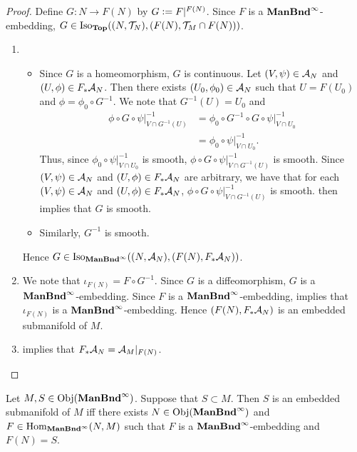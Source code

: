 \documentclass{book}
\begin{document}
	\begin{proof} Define $G:N \rightarrow F(N)$ by $G \vcentcolon= F|^{F(N)}$. Since $F$ is a $\operatorname*{\text{\textbf{ManBnd}}^{\infty}}$-embedding, $G \in \operatorname{Iso}_{\operatorname*{\text{\textbf{Top}}}}((N, \mathcal{T}_N), (F(N), \mathcal{T}_M \cap F(N)))$. 
		\begin{enumerate}
			\item 
			\begin{itemize}
				\item Since $G$ is a homeomorphism, $G$ is continuous. Let $(V, \psi) \in \mathcal{A}_N$ and $(U, \phi) \in F_*\mathcal{A}_N$. Then there exists $(U_0, \phi_0) \in \mathcal{A}_N$ such that $U = F(U_0)$ and $\phi = \phi_0 \circ G^{-1}$. We note that $G^{-1}(U) = U_0$ and 
				\begin{align*}
					\phi \circ G \circ \psi|_{V \cap G^{-1}(U)}^{-1}
					& = \phi_0 \circ G^{-1} \circ G \circ \psi|_{V \cap U_0}^{-1} \\
					& = \phi_0 \circ \psi|_{V \cap U_0}^{-1}. 
				\end{align*}
				Thus, since $\phi_0 \circ \psi|_{V \cap U_0}^{-1}$ is smooth, $\phi \circ G \circ \psi|_{V \cap G^{-1}(U)}^{-1}$ is smooth. Since $(V, \psi) \in \mathcal{A}_N$ and $(U, \phi) \in F_*\mathcal{A}_N$ are arbitrary, we have that for each $(V, \psi) \in \mathcal{A}_N$ and $(U, \phi) \in F_*\mathcal{A}_N$, $\phi \circ G \circ \psi|_{V \cap G^{-1}(U)}^{-1}$ is smooth.  then implies that $G$ is smooth. 
				\item Similarly, $G^{-1}$ is smooth.
			\end{itemize}
			Hence $G \in \operatorname{Iso}_{\operatorname*{\text{\textbf{ManBnd}}^{\infty}}}((N, \mathcal{A}_N), (F(N), F_*\mathcal{A}_N))$.
			\item We note that $\iota_{F(N)} = F \circ G^{-1}$. Since $G$ is a diffeomorphism, $G$ is a $\operatorname*{\text{\textbf{ManBnd}}^{\infty}}$-embedding. Since $F$ is a $\operatorname*{\text{\textbf{ManBnd}}^{\infty}}$-embedding, \rex{}  implies that $\iota_{F(N)}$ is a $\operatorname*{\text{\textbf{ManBnd}}^{\infty}}$-embedding. Hence $(F(N), F_*\mathcal{A}_N)$ is an embedded submanifold of $M$. 
			\item {} implies that $F_*\mathcal{A}_N = \mathcal{A}_M|_{F(N)}$.
		\end{enumerate}
	\end{proof}
	
	\begin{ex} 
		Let $M,S \in \operatorname{Obj}(\operatorname*{\text{\textbf{ManBnd}}^{\infty}})$. Suppose that $S \subset M$. Then $S$ is an embedded submanifold of $M$ iff there exists $N \in \operatorname{Obj}(\operatorname*{\text{\textbf{ManBnd}}^{\infty}})$ and $F \in \operatorname{Hom}_{\operatorname*{\text{\textbf{ManBnd}}^{\infty}}}(N, M)$ such that $F$ is a $\operatorname*{\text{\textbf{ManBnd}}^{\infty}}$-embedding and $F(N) = S$.
	\end{ex}	
	
\end{document}
